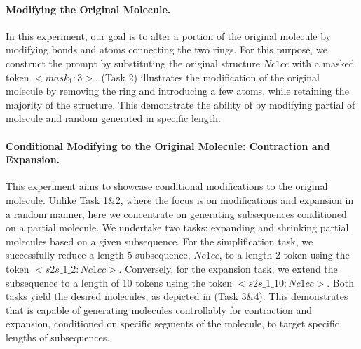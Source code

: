 \paragraph{Modifying the Original Molecule.} 
\label{exp:modify}
{In this experiment, our goal is to alter a portion of the original molecule by modifying bonds and atoms connecting the two rings. }
For this purpose, we construct the prompt by substituting the original structure $Nc1cc$ with a masked token $<mask_1:3>$.  (Task 2) illustrates the modification of the original molecule by removing the ring and introducing a few atoms, while retaining the majority of the structure. This demonstrate the ability of \algname by modifying partial of molecule and random generated in specific length.

\vspace{-0.1cm}



\paragraph{Conditional Modifying to the Original Molecule: Contraction and Expansion.}
This experiment aims to showcase conditional modifications to the original molecule. Unlike Task 1$\&$2,
where the focus is on modifications and expansion in a random manner, here we concentrate on generating subsequences conditioned on a partial molecule. We undertake two tasks: expanding and shrinking partial molecules based on a given subsequence.
For the simplification task, we successfully reduce a length 5 subsequence, $Nc1cc$, to a length 2 token using the  token $<s2s\_1\_2:Nc1cc>$. Conversely, for the expansion task, we extend the subsequence to a length of 10 tokens using the   token $<s2s\_1\_10:Nc1cc>$. Both tasks yield the desired molecules, as depicted in  (Task 3$\&$4).
This demonstrates that \algname is capable of generating molecules controllably for contraction and expansion, conditioned on specific segments of the molecule, to target specific lengths of subsequences.




